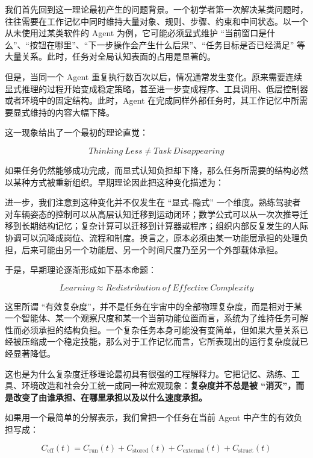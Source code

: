我们首先回到这一理论最初产生的问题背景。一个初学者第一次解决某类问题时，往往需要在工作记忆中同时维持大量对象、规则、步骤、约束和中间状态。以一个从未使用过某类软件的 Agent 为例，它可能必须显式维护 ``当前窗口是什么''、``按钮在哪里''、``下一步操作会产生什么后果''、``任务目标是否已经满足'' 等大量关系。此时，任务对全局认知表面的占用是显著的。

但是，当同一个 Agent 重复执行数百次以后，情况通常发生变化。原来需要连续显式推理的过程开始变成稳定策略，甚至进一步变成程序、工具调用、低层控制器或者环境中的固定结构。此时，Agent 在完成同样外部任务时，其工作记忆中所需要显式维持的内容大幅下降。

这一现象给出了一个最初的理论直觉：

\[
\boxed{
Thinking\ Less
\neq
Task\ Disappearing
}
\]

如果任务仍然能够成功完成，而显式认知负担却下降，那么任务所需要的结构必然以某种方式被重新组织。早期理论因此把这种变化描述为：

\begin{statementbox}
\centering
{}
\end{statementbox}

进一步，我们注意到这种变化并不仅发生在 ``显式--隐式'' 一个维度。熟练驾驶者对车辆姿态的控制可以从高层认知迁移到运动闭环；数学公式可以从一次次推导迁移到长期结构记忆；复杂计算可以迁移到计算器或程序；组织内部反复发生的人际协调可以沉降成岗位、流程和制度。换言之，原本必须由某一功能层承担的处理负担，后来可能由另一个功能层、另一个时间尺度乃至另一个外部载体承担。

于是，早期理论逐渐形成如下基本命题：

\[
\boxed{
Learning
\approx
Redistribution\ of\ Effective\ Complexity
}
\]

这里所谓 ``有效复杂度''，并不是任务在宇宙中的全部物理复杂度，而是相对于某一个智能体、某一个观察尺度和某一个当前功能位置而言，系统为了维持任务可解性而必须承担的结构负担。一个复杂任务本身可能没有变简单，但如果大量关系已经被压缩成一个稳定技能，那么对于工作记忆而言，它所表现出的运行复杂度就已经显著降低。

这也是为什么复杂度迁移理论最初具有很强的工程解释力。它把记忆、熟练、工具、环境改造和社会分工统一成同一种宏观现象：\textbf{复杂度并不总是被 ``消灭''，而是改变了由谁承担、在哪里承担以及以什么速度承担。}

如果用一个最简单的分解表示，我们曾把一个任务在当前 Agent 中产生的有效负担写成：

\[
C_{\mathrm{eff}}(t)
=
C_{\mathrm{run}}(t)
+
C_{\mathrm{stored}}(t)
+
C_{\mathrm{external}}(t)
+
C_{\mathrm{struct}}(t)
\]

